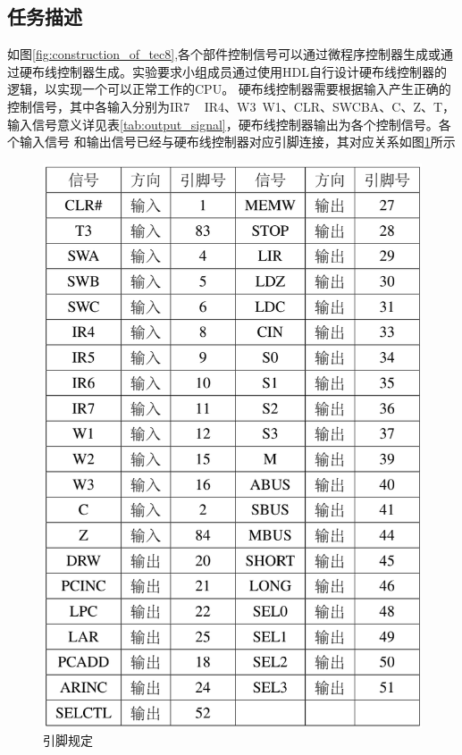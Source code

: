 \subsection{任务描述}

如图\ref{fig:construction_of_tec8},各个部件控制信号可以通过微程序控制器生成或通过硬布线控制器生成。实验要求小组成员通过使用HDL自行设计硬布线控制器的逻辑，以实现一个可以正常工作的CPU。
硬布线控制器需要根据输入产生正确的控制信号，其中各输入分别为IR7 ~ IR4、W3~W1、CLR、SWCBA、C、Z、T，输入信号意义详见表\ref{tab:output_signal}，硬布线控制器输出为各个控制信号。各个输入信号
和输出信号已经与硬布线控制器对应引脚连接，其对应关系如图\ref{fig:pins}所示

\begin{figure}[htbp]
    \centering
    \includegraphics{figures/chapter1/pins.png}
    \caption{引脚规定}
    \label{fig:pins}
\end{figure}


